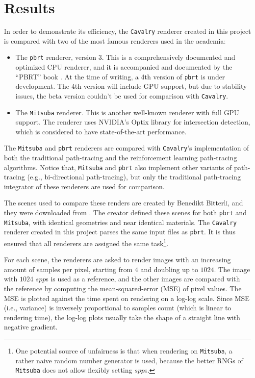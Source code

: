 \chapter{Results}

In order to demonstrate its efficiency, the \texttt{Cavalry} renderer created in this project is compared with two of the most famous renderers used in the academia:

\begin{itemize}
    \item The \texttt{pbrt} renderer, version 3. This is a comprehensively documented and optimized CPU renderer, and it is accompanied and documented by the ``PBRT'' book \cite{pharr2016physically}. At the time of writing, a 4th version of \texttt{pbrt} is under development. The 4th version will include GPU support, but due to stability issues, the beta version couldn't be used for comparison with \texttt{Cavalry}.
    
    \item The \texttt{Mitsuba} renderer. This is another well-known renderer with full GPU support. The renderer uses NVIDIA's Optix library for intersection detection, which is considered to have state-of-the-art performance.  
\end{itemize}

The \texttt{Mitsuba} and \texttt{pbrt} renderers are compared with \texttt{Cavalry}'s implementation of both the traditional path-tracing and the reinforcement learning path-tracing algorithms. Notice that, \texttt{Mitsuba} and \texttt{pbrt} also implement other variants of path-tracing (e.g., bi-directional path-tracing), but only the traditional path-tracing integrator of these renderers are used for comparison.

The scenes used to compare these renders are created by Benedikt Bitterli, and they were downloaded from \cite{resources16}. The creator defined these scenes for both \texttt{pbrt} and \texttt{Mitsuba}, with identical geometries and near identical materials. The \texttt{Cavalry} renderer created in this project parses the same input files as \texttt{pbrt}. It is thus ensured that all renderers are assigned the same task\footnote{One potential source of unfairness is that when rendering on \texttt{Mitsuba}, a rather naive random number generator is used, because the better RNGs of \texttt{Mitsuba} does not allow flexibly setting $spp$s.}.

For each scene, the renderers are asked to render images with an increasing amount of samples per pixel, starting from $4$ and doubling up to $1024$. The image with $1024$ $spp$s is used as a reference, and the other images are compared with the reference by computing the mean-squared-error (MSE) of pixel values. The MSE is plotted against the time spent on rendering on a log-log scale. Since MSE (i.e., variance) is inversely proportional to samples count (which is linear to rendering time), the log-log plots usually take the shape of a straight line with negative gradient.

